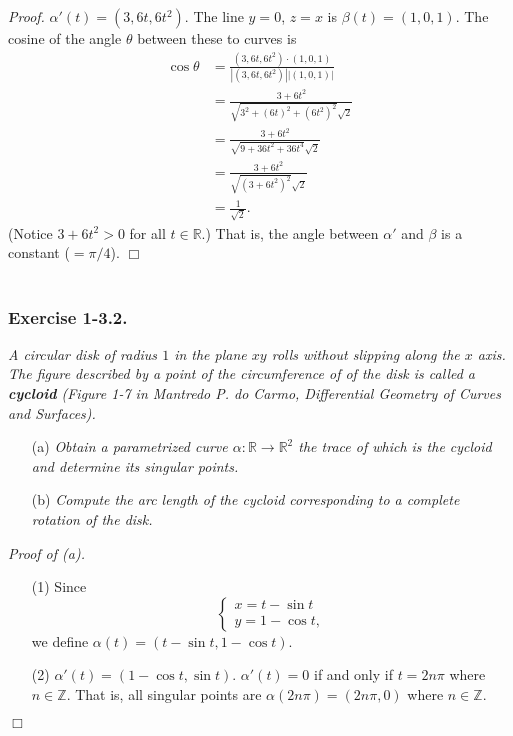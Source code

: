 \documentclass{article}
\begin{document}
\emph{Proof.}
$\alpha'(t) = (3, 6t, 6t^2)$.
The line $y = 0$, $z = x$ is $\beta(t) = (1,0,1)$.
The cosine of the angle $\theta$ between these to curves is
\begin{align*}
  \cos \theta
  &= \frac{(3, 6t, 6t^2) \cdot (1,0,1)}{|(3, 6t, 6t^2)||(1,0,1)|} \\
  &= \frac{3+6t^2}{\sqrt{3^2 + (6t)^2 + (6t^2)^2}\sqrt{2}} \\
  &= \frac{3+6t^2}{\sqrt{9 + 36 t^2 + 36t^4}\sqrt{2}} \\
  &= \frac{3+6t^2}{\sqrt{(3 + 6t^2)^2}\sqrt{2}} \\
  &= \frac{1}{\sqrt{2}}.
\end{align*}
(Notice $3 + 6t^2 > 0$ for all $t \in \mathbb{R}$.)
That is, the angle between $\alpha'$ and $\beta$ is a constant ($= \pi/4$).
$\Box$ \\\\






\subsubsection*{Exercise 1-3.2.}
\emph{A circular disk of radius $1$ in the plane $xy$ rolls without slipping
along the $x$ axis.
The figure described by a point of the circumference of of the disk is
called a \textbf{cycloid}
(Figure 1-7 in Mantredo P. do Carmo, Differential Geometry of Curves and Surfaces).}
\begin{enumerate}
\item[(a)]
  \emph{Obtain a parametrized curve $\alpha: \mathbb{R} \to \mathbb{R}^2$
  the trace of which is the cycloid and determine its singular points.}

\item[(b)]
  \emph{Compute the arc length of the cycloid
  corresponding to a complete rotation of the disk.} \\
\end{enumerate}



\emph{Proof of (a).}
\begin{enumerate}
\item[(1)]
Since
\begin{equation*}
  \begin{cases}
     x = t - \sin t \\
     y = 1 - \cos t,
  \end{cases}
\end{equation*}
we define $\alpha(t) = (t - \sin t, 1 - \cos t)$.
\item[(2)]
$\alpha'(t) = (1 - \cos t, \sin t)$.
$\alpha'(t) = 0$ if and only if $t = 2n\pi$ where $n \in \mathbb{Z}$.
That is, all singular points are $\alpha(2n\pi) = (2n\pi, 0)$ where $n \in \mathbb{Z}$.
\end{enumerate}
$\Box$ \\
\end{document}
